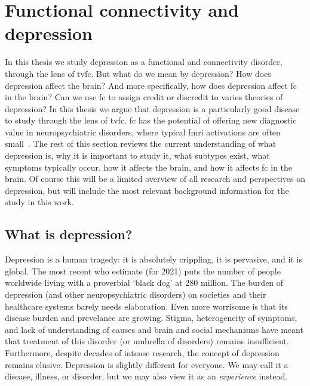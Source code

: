 \clearpage
\section{Functional connectivity and depression}
\label{sec:fc-depression}

In this thesis we study depression as a functional and connectivity disorder, through the lens of \gls{tvfc}.
But what do we mean by depression?
How does depression affect the brain?
And more specifically, how does depression affect \gls{fc} in the brain?
Can we use \gls{fc} to assign credit or discredit to varies theories of depression?
In this thesis we argue that depression is a particularly good disease to study through the lens of \gls{tvfc}.
\gls{fc} has the potential of offering new diagnostic value in neuropsychiatric disorders, where typical \gls{fmri} activations are often small~\parencite{Fornito2012}.
The rest of this section reviews the current understanding of what depression is, why it is important to study it, what subtypes exist, what symptoms typically occur, how it affects the brain, and how it affects \gls{fc} in the brain.
Of course this will be a limited overview of all research and perspectives on depression, but will include the most relevant background information for the study in this work.

\subsection{What is depression?}
\label{subsec:depression}

Depression is a human tragedy: it is absolutely crippling, it is pervasive, and it is global.
The most recent \gls{who} estimate (for 2021) puts the number of people worldwide living with a proverbial `black dog' at 280 million.
The burden of depression (and other neuropsychiatric disorders) on societies and their healthcare systems barely needs elaboration.
Even more worrisome is that its disease burden and prevelance are growing.
Stigma, heterogeneity of symptoms, and lack of understanding of causes and brain and social mechanisms have meant that treatment of this disorder (or umbrella of disorders) remains insufficient.
Furthermore, despite decades of intense research, the concept of depression remains elusive.
Depression is slightly different for everyone.
We may call it a disease, illness, or disorder, but we may also view it as an \emph{experience} instead.

